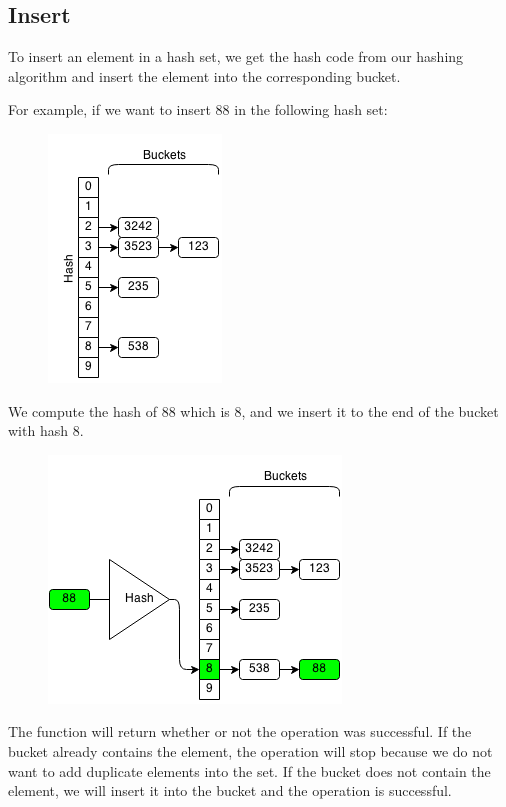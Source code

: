 \documentclass[11pt,oneside]{book}
\makeatletter
\def\maxwidth#1{\ifdim\Gin@nat@width>#1 #1\else\Gin@nat@width\fi}
\makeatother
\begin{document}
\subsection{Insert}

To insert an element in a hash set, we get the hash code from our hashing algorithm and insert the element into the corresponding bucket.

For example, if we want to insert 88 in the following hash set:

\vspace{5px}\begin{figure}[H]\centering
        \includegraphics[width=0.66\maxwidth{\textwidth}]{hashset.png}
        \end{figure}

We compute the hash of 88 which is 8, and we insert it to the end of the bucket with hash 8.

\vspace{5px}\begin{figure}[H]\centering
        \includegraphics[width=0.66\maxwidth{\textwidth}]{hashsetinsert.png}
        \end{figure}

The function will return whether or not the operation was successful. If the bucket already contains the element, the operation will stop because we do not want to add duplicate elements into the set. If the bucket does not contain the element, we will insert it into the bucket and the operation is successful.
\end{document}

